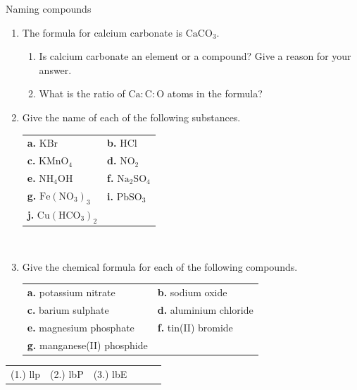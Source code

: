   \label{m38708*secfhsst!!!underscore!!!id255}
            \begin{exercises}{Naming compounds}
{            \nopagebreak \noindent
      \label{m38708*id65118}\begin{enumerate}[noitemsep, label=\textbf{\arabic*}. ] 
\item The formula for calcium carbonate is $\text{CaCO}{}_{3}$.
 \begin{enumerate}[noitemsep, label=\textbf{\alph*}. ] 
\item Is calcium carbonate an element or a compound? Give a reason for your answer.
\item What is the ratio of $\text{Ca}:\text{C}:\text{O}$ atoms in the formula?
\end{enumerate}
\item Give the name of each of the following substances.\\
\begin{tabular}{ll}
\textbf{a.} $\text{KBr}$ & \textbf{b.} $\text{HCl}$ \\
\textbf{c.} ${\text{KMnO}}_{4}$ & \textbf{d.} ${\text{NO}}_{2}$ \\
\textbf{e.} ${\text{NH}}_{4}\text{OH}$ & \textbf{f.} ${\text{Na}}_{2}{\text{SO}}_{4}$ \\
\textbf{g.} ${\text{Fe}}({\text{NO}}_{3})_3$ & \textbf{i.} ${\text{Pb}}{\text{SO}}_{3}$ \\
\textbf{j.} ${\text{Cu}}({\text{HCO}}_{3})_2$ & \\
\end{tabular}\\
\item Give the chemical formula for each of the following compounds.\\
\begin{tabular}{ll}
\textbf{a.} potassium nitrate & \textbf{b.} sodium oxide \\
\textbf{c.} barium sulphate & \textbf{d.} aluminium chloride \\
\textbf{e.} magnesium phosphate & \textbf{f.} tin(II) bromide \\
\textbf{g.} manganese(II) phosphide & \\
\end{tabular}
\end{enumerate}
\practiceinfo
    \label{m38708*cid5}
\par 
 \par \begin{tabular}[h]{cccccc}
 (1.) llp  &  (2.) lbP  &  (3.) lbE   & & \end{tabular}}
\end{exercises}
